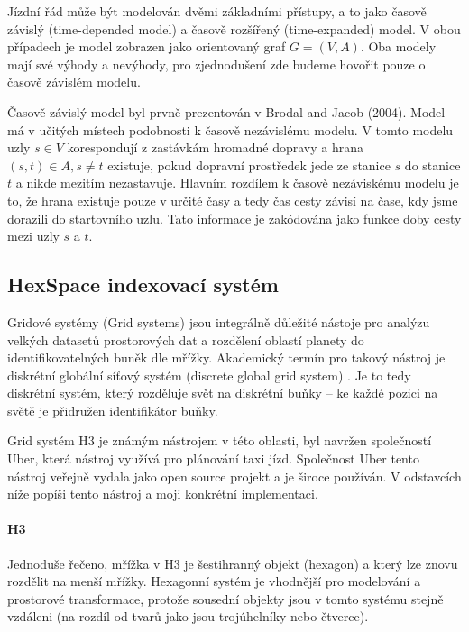 \documentclass[thesis=M,czech]{FITthesis}[2019/12/23]
\theoremstyle{plain}
\theoremstyle{definition}
\begin{document}
Jízdní řád může být modelován dvěmi základními přístupy, a to jako časově závislý (time-depended model) a časově rozšířený (time-expanded) model. V obou případech je model zobrazen jako orientovaný graf $G = (V, A)$. Oba modely mají své výhody a nevýhody, pro zjednodušení zde budeme hovořit pouze o časově závislém modelu. 

Časově závislý model byl prvně prezentován v Brodal and Jacob (2004)\cite{time-dependent-networks-as-models-to-achieve-fast-exact-time-table-queries}. Model má v učitých místech podobnosti k časově nezávislému modelu. V tomto modelu uzly  $ s \in V $ korespondují z zastávkám hromadné dopravy a hrana $ (s, t) \in A, s \neq t $ existuje, pokud dopravní prostředek jede ze stanice $s$ do stanice $t$ a nikde mezitím nezastavuje. Hlavním rozdílem k časově nezáviskému modelu je to, že hrana existuje pouze v určité časy a tedy čas cesty závisí na čase, kdy jsme dorazili do startovního uzlu. Tato informace je zakódována jako funkce doby cesty mezi uzly $s$ a $t$.



\subsection{HexSpace indexovací systém} \label{HexSpace indexovací systém}

Gridové systémy (Grid systems) jsou integrálně důležité nástoje pro analýzu velkých datasetů prostorových dat a rozdělení oblastí planety do identifikovatelných buněk dle mřížky. Akademický termín pro takový nástroj je diskrétní globální síťový systém (discrete global grid system) \cite{discrete-global-grid}. Je to tedy diskrétní systém, který rozděluje svět na diskrétní buňky -- ke každé pozici na světě je přidružen identifikátor buňky.


Grid systém H3 je známým nástrojem v této oblasti, byl navržen společností Uber, která nástroj využívá pro plánování taxi jízd. Společnost Uber tento nástroj veřejně vydala jako open source projekt a je široce používán. V odstavcích níže popíši tento nástroj a moji konkrétní implementaci.


\paragraph{H3}

Jednoduše řečeno, mřížka v H3 je šestihranný objekt (hexagon) a který lze znovu rozdělit na menší mřížky. Hexagonní systém je vhodnější pro modelování a prostorové transformace, protože sousední objekty jsou v tomto systému stejně vzdáleni (na rozdíl od tvarů jako jsou trojúhelníky nebo čtverce). 
\end{document}
